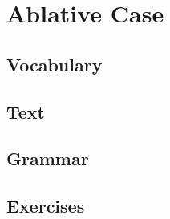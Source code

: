 \chapter{Ablative Case}
\section*{Vocabulary}
\section*{Text}
\section*{Grammar}
\section*{Exercises}
